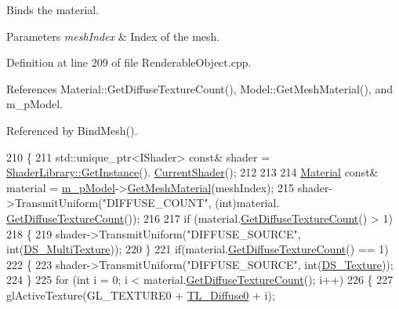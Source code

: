 Binds the material. 


\begin{DoxyParams}{Parameters}
{\em mesh\+Index} & Index of the mesh.\\
\hline
\end{DoxyParams}


Definition at line 209 of file Renderable\+Object.\+cpp.



References Material\+::\+Get\+Diffuse\+Texture\+Count(), Model\+::\+Get\+Mesh\+Material(), and m\+\_\+p\+Model.



Referenced by Bind\+Mesh().


\begin{DoxyCode}
210 \{
211     std::unique\_ptr<IShader> \textcolor{keyword}{const}& shader = \hyperlink{class_singleton_a74f32751d99bf3cc95fe17aba11f4b07}{ShaderLibrary::GetInstance}().
      \hyperlink{struct_shader_library_af15e65d4d0b648272428fc167a6d03b9}{CurrentShader}();
212   
213     
214     \hyperlink{class_material}{Material} \textcolor{keyword}{const}& material = \hyperlink{class_renderable_object_aab96dcc31d9e748645868c9449ae8cb6}{m\_pModel}->\hyperlink{class_model_a6266aadeb0b38caa954034c4c914817a}{GetMeshMaterial}(meshIndex);
215     shader->TransmitUniform(\textcolor{stringliteral}{"DIFFUSE\_COUNT"}, (\textcolor{keywordtype}{int})material.
      \hyperlink{class_material_a11e5c7f30a1b4aaf465eb611c4d2baa2}{GetDiffuseTextureCount}());
216 
217     \textcolor{keywordflow}{if} (material.\hyperlink{class_material_a11e5c7f30a1b4aaf465eb611c4d2baa2}{GetDiffuseTextureCount}() > 1)
218     \{
219       shader->TransmitUniform(\textcolor{stringliteral}{"DIFFUSE\_SOURCE"}, \textcolor{keywordtype}{int}(\hyperlink{_renderable_object_8h_a650ae6a29421b549c3c3a65cee51f41ba18834e8fab1d5c3726346509c61983ed}{DS\_MultiTexture}));
220     \}
221     \textcolor{keywordflow}{if}(material.\hyperlink{class_material_a11e5c7f30a1b4aaf465eb611c4d2baa2}{GetDiffuseTextureCount}() == 1)
222     \{
223       shader->TransmitUniform(\textcolor{stringliteral}{"DIFFUSE\_SOURCE"}, \textcolor{keywordtype}{int}(\hyperlink{_renderable_object_8h_a650ae6a29421b549c3c3a65cee51f41ba8052e85b32f0b20d6047c2e97e0a0a03}{DS\_Texture}));
224     \}
225     \textcolor{keywordflow}{for} (\textcolor{keywordtype}{int} i = 0; i < material.\hyperlink{class_material_a11e5c7f30a1b4aaf465eb611c4d2baa2}{GetDiffuseTextureCount}(); i++)
226     \{
227       glActiveTexture(GL\_TEXTURE0 + \hyperlink{_renderable_object_8h_a73712b1b23911f45e8325b203e78a066ab1df4354fa133fc996d2f179c748b202}{TL\_Diffuse0} + i);

\end{DoxyCode}
